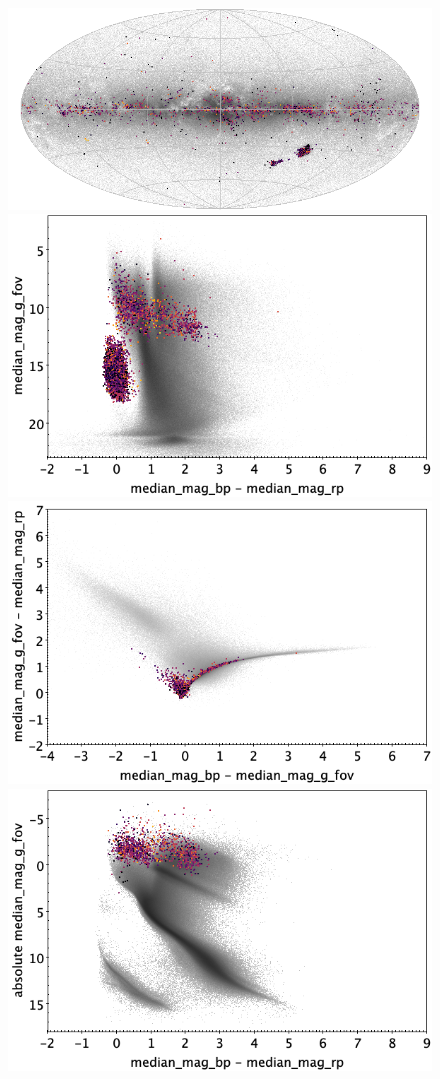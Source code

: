 \documentclass[longauth]{aa}
\begin{document}
\begin{appendix}
\begin{figure}
\centering
{}
\includegraphics[width=0.6\hsize]{figures/appendix/BE_cls_sky.png} 
 \\ %
\vspace{4mm}
 \includegraphics[width=0.45\hsize]{figures/appendix/BE_cls_cm.png}  %
\hspace{2mm}
 \includegraphics[width=0.45\hsize]{figures/appendix/BE_cls_cc.png} \\ %
\vspace{4mm}
 \includegraphics[width=0.45\hsize]{figures/appendix/BE_cls_cam.png}  %

\end{figure}
\end{appendix}
\end{document}
